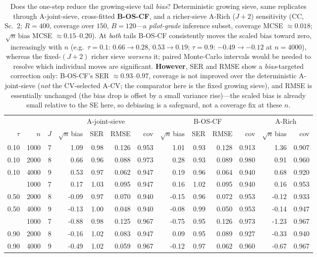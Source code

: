 \begin{table}[t]\centering\small
\caption{Does the one-step reduce the growing-sieve tail \emph{bias}? Deterministic growing sieve, same replicates through A-joint-sieve, cross-fitted \textbf{B-OS-CF}, and a richer-sieve A-Rich ($J{+}2$) sensitivity (CC, Sc.\ 2; $R=400$, coverage over $150$, $B=120$---a \emph{pilot-grade} inference subset, coverage MCSE $\approx0.018$; $\sqrt n\,$bias MCSE $\approx0.15$--$0.20$). At \emph{both} tails B-OS-CF consistently moves the scaled bias toward zero, increasingly with $n$ (e.g.\ $\tau{=}0.1$: $0.66{\to}0.28$, $0.53{\to}0.19$; $\tau{=}0.9$: $-0.49{\to}-0.12$ at $n{=}4000$), whereas the fixed-$(J{+}2)$ richer sieve \emph{worsens} it; paired Monte-Carlo intervals would be needed to resolve which individual moves are significant. \textbf{However}, SER and RMSE show a \emph{bias}-targeted correction only: B-OS-CF's SER $\approx0.93$--$0.97$, coverage is not improved over the deterministic A-joint-sieve (\emph{not} the CV-selected A-CV; the comparator here is the fixed growing sieve), and RMSE is essentially unchanged (the bias drop is offset by a small variance rise)---the scaled bias is already small relative to the SE here, so debiasing is a safeguard, not a coverage fix at these $n$.}
\label{tab:sievetail}\begin{tabular}{rr r rrrr rrrr rr}\toprule
&&& \multicolumn{4}{c}{A-joint-sieve} & \multicolumn{4}{c}{B-OS-CF} & \multicolumn{2}{c}{A-Rich}\\
\cmidrule(lr){4-7}\cmidrule(lr){8-11}\cmidrule(lr){12-13}
$\tau$&$n$&$J$&$\sqrt n\,$bias&SER&RMSE&cov&$\sqrt n\,$bias&SER&RMSE&cov&$\sqrt n\,$bias&cov\\\midrule
0.10 & 1000 & 7 & 1.09 & 0.98 & 0.126 & 0.953 & 1.01 & 0.93 & 0.128 & 0.913 & 1.36 & 0.907 \\
0.10 & 2000 & 8 & 0.66 & 0.96 & 0.088 & 0.973 & 0.28 & 0.93 & 0.089 & 0.980 & 0.91 & 0.960 \\
0.10 & 4000 & 9 & 0.53 & 0.97 & 0.062 & 0.947 & 0.19 & 0.96 & 0.064 & 0.940 & 0.68 & 0.920 \\
\addlinespace
0.50 & 1000 & 7 & 0.17 & 1.03 & 0.095 & 0.947 & 0.16 & 1.02 & 0.095 & 0.940 & 0.16 & 0.953 \\
0.50 & 2000 & 8 & -0.09 & 0.97 & 0.070 & 0.940 & -0.15 & 0.96 & 0.072 & 0.953 & -0.12 & 0.933 \\
0.50 & 4000 & 9 & -0.13 & 1.00 & 0.048 & 0.940 & -0.08 & 0.99 & 0.050 & 0.953 & -0.14 & 0.947 \\
\addlinespace
0.90 & 1000 & 7 & -0.88 & 0.98 & 0.125 & 0.967 & -0.75 & 0.95 & 0.126 & 0.973 & -1.23 & 0.967 \\
0.90 & 2000 & 8 & -0.16 & 1.02 & 0.083 & 0.947 & 0.09 & 0.95 & 0.089 & 0.927 & -0.33 & 0.940 \\
0.90 & 4000 & 9 & -0.49 & 1.02 & 0.059 & 0.967 & -0.12 & 0.97 & 0.062 & 0.960 & -0.67 & 0.967 \\
\bottomrule\end{tabular}\end{table}
